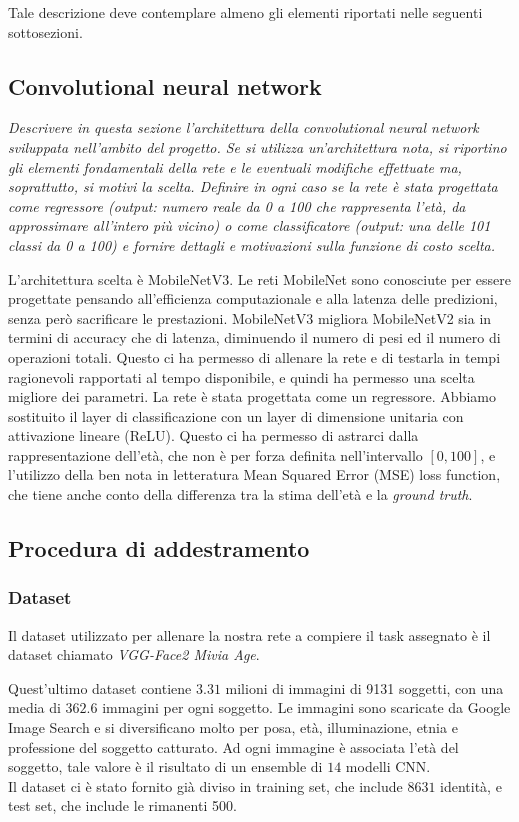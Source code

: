 Tale descrizione deve contemplare almeno gli elementi riportati nelle seguenti
sottosezioni.

\subsection{Convolutional neural network}
\emph{Descrivere in questa sezione l’architettura della convolutional neural network
sviluppata nell’ambito del progetto. Se si utilizza un’architettura nota, si riportino gli elementi fondamentali della rete e le eventuali modifiche effettuate ma, soprattutto, si motivi la scelta.
Definire in ogni caso se la rete è stata progettata come regressore (output:
numero reale da 0 a 100 che rappresenta l’età, da approssimare all’intero più
vicino) o come classificatore (output: una delle 101 classi da 0 a 100) e fornire dettagli e motivazioni sulla funzione di costo scelta.}

L'architettura scelta è MobileNetV3. Le reti MobileNet sono conosciute per essere progettate pensando all'efficienza computazionale e alla latenza delle predizioni, senza però sacrificare le prestazioni. MobileNetV3 migliora MobileNetV2 sia in termini di accuracy che di latenza, diminuendo il numero di pesi ed il numero di operazioni totali. Questo ci ha permesso di allenare la rete e di testarla in tempi ragionevoli rapportati al tempo disponibile, e quindi ha permesso una scelta migliore dei parametri.
La rete è stata progettata come un regressore. Abbiamo sostituito il layer di classificazione con un layer di dimensione unitaria con attivazione lineare (ReLU). Questo ci ha permesso di astrarci dalla rappresentazione dell'età, che non è per forza definita nell'intervallo \([0, 100]\), e l'utilizzo della ben nota in letteratura Mean Squared Error (MSE) loss function, che tiene anche conto della differenza tra la stima dell'età e la \emph{ground truth}.

\subsection{Procedura di addestramento}
\subsubsection{Dataset}

Il dataset utilizzato per allenare la nostra rete a compiere il task assegnato è il dataset chiamato \emph{VGG-Face2 Mivia Age}.

Quest'ultimo dataset contiene $3.31$ milioni di immagini di 9131 soggetti, con una media di $362.6$ immagini per ogni soggetto. Le immagini sono scaricate da Google Image Search e si diversificano molto per posa, età, illuminazione, etnia e professione del soggetto catturato. Ad ogni immagine è associata l'età del soggetto, tale valore è il risultato di un ensemble di $14$ modelli CNN.\\
Il dataset ci è stato fornito già diviso in training set, che include $8631$ identità, e test set, che include le rimanenti 500.


